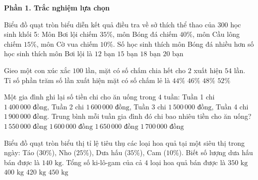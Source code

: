 \textbf{Phần 1. Trắc nghiệm lựa chọn}

\begin{ex} %
Biểu đồ quạt tròn biểu diễn kết quả điều tra về sở thích thể thao của $300$ học sinh khối 5: Môn Bơi lội chiếm $35\%$, môn Bóng đá chiếm $40\%$, môn Cầu lông chiếm $15\%$, môn Cờ vua chiếm $10\%$. Số học sinh thích môn Bóng đá nhiều hơn số học sinh thích môn Bơi lội là
\choice
{$12\text{ bạn}$}
{\True $15\text{ bạn}$}
{$18\text{ bạn}$}
{$20\text{ bạn}$}
\end{ex}

\begin{ex} %
Gieo một con xúc xắc $100$ lần, mặt có số chấm chia hết cho $2$ xuất hiện $54$ lần. Tỉ số phần trăm số lần xuất hiện mặt có số chấm lẻ là
\choice
{$44\%$}
{\True $46\%$}
{$48\%$}
{$52\%$}
\end{ex}

\begin{ex} %
Một gia đình ghi lại số tiền chi cho ăn uống trong $4$ tuần: Tuần 1 chi $1\,400\,000\text{ đồng}$, Tuần 2 chi $1\,600\,000\text{ đồng}$, Tuần 3 chi $1\,500\,000\text{ đồng}$, Tuần 4 chi $1\,900\,000\text{ đồng}$. Trung bình mỗi tuần gia đình đó chi bao nhiêu tiền cho ăn uống?
\choice
{$1\,550\,000\text{ đồng}$}
{\True $1\,600\,000\text{ đồng}$}
{$1\,650\,000\text{ đồng}$}
{$1\,700\,000\text{ đồng}$}
\end{ex}

\begin{ex} %
Biểu đồ quạt tròn biểu thị tỉ lệ tiêu thụ các loại hoa quả tại một siêu thị trong ngày: Táo ($30\%$), Nho ($25\%$), Dưa hấu ($35\%$), Cam ($10\%$). Biết số lượng dưa hấu bán được là $140\text{ kg}$. Tổng số ki-lô-gam của cả $4$ loại hoa quả bán được là
\choice
{$350\text{ kg}$}
{\True $400\text{ kg}$}
{$420\text{ kg}$}
{$450\text{ kg}$}
\end{ex}

